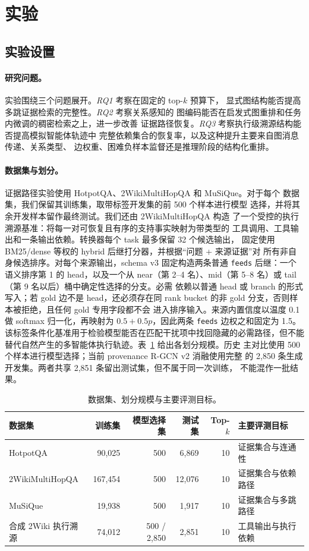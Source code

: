 \section{实验}

\subsection{实验设置}

\paragraph{研究问题。}
实验围绕三个问题展开。\emph{RQ1} 考察在固定的 top-$k$ 预算下，
显式图结构能否提高多跳证据检索的完整性。\emph{RQ2} 考察关系感知的
图编码能否在启发式图重排和任务内微调的稠密检索之上，进一步改善
证据路径恢复。\emph{RQ3} 考察执行级溯源结构能否提高模拟智能体轨迹中
完整依赖集合的恢复率，以及这种提升主要来自图消息传递、关系类型、
边权重、困难负样本监督还是推理阶段的结构化重排。

\paragraph{数据集与划分。}
证据路径实验使用 HotpotQA、2WikiMultiHopQA 和 MuSiQue。对于每个
数据集，我们保留其训练集，取带标签开发集的前 500 个样本进行模型
选择，并将其余开发样本留作最终测试。我们还由 2WikiMultiHopQA 构造
了一个受控的执行溯源基准：将每一对可恢复且有序的支持事实映射为带类型的
工具调用、工具输出和一条输出依赖。转换器每个 task 最多保留 32 个候选输出，
固定使用 BM25/dense 等权的 hybrid 后继打分器，并根据“问题 + 来源证据”对
所有非自身候选排序。对每个来源输出，schema v3 固定构造两条普通
\texttt{feeds} 后继：一个语义排序第 1 的 head，以及一个从 near（第 2--4
名）、mid（第 5--8 名）或 tail（第 9 名以后）桶中确定性选择的分支。必需
依赖以普通 head 或 branch 的形式写入；若 gold 边不是 head，还必须存在同
rank bucket 的非 gold 分支，否则样本被拒绝，且任何 gold 专用字段都不会
进入排序输入。来源内置信度以温度 0.1 做 softmax 归一化，再映射为
$0.5+0.5p$，因此两条 \texttt{feeds} 边权之和固定为 1.5。
该标签条件化基准用于检验模型能否在匹配干扰项中找回隐藏的必需路径，但不能
替代自然产生的多智能体执行轨迹。表~\ref{tab:data} 给出各划分规模。历史
主对比使用 500 个样本进行模型选择；当前 provenance R-GCN v2 消融使用完整
的 2,850 条生成开发集。两者共享 2,851 条留出测试集，但不属于同一次训练，
不能混作一批结果。

\begin{table}[t]
\centering
\small
\caption{数据集、划分规模与主要评测目标。}
\label{tab:data}
\begin{tabular}{lrrrrl}
\hline
数据集 & 训练集 & 模型选择集 & 测试集 & Top-$k$ & 主要评测目标 \\
\hline
HotpotQA & 90,025 & 500 & 6,869 & 10 & 证据集合与连通性 \\
2WikiMultiHopQA & 167,454 & 500 & 12,076 & 10 & 证据集合与依赖路径 \\
MuSiQue & 19,938 & 500 & 1,917 & 10 & 证据集合与多跳路径 \\
合成 2Wiki 执行溯源 & 74,012 & 500 / 2,850 & 2,851 & 10 & 工具输出与执行依赖 \\
\hline
\end{tabular}
\end{table}

